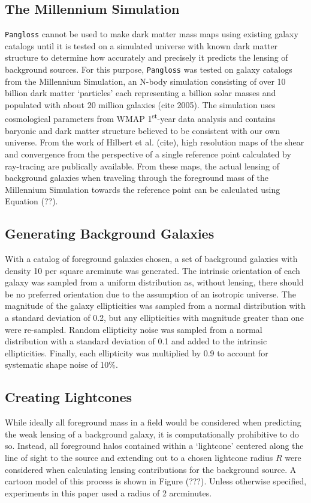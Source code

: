 \documentclass[%
 reprint,
 amsmath,amssymb,
 aps,
]{revtex4-1}
\begin{document}
\subsection*{The Millennium Simulation}
\texttt{Pangloss} cannot be used to make dark matter mass maps using existing galaxy catalogs until it is tested on a simulated universe with known dark matter structure to determine how accurately and precisely it predicts the lensing of background sources. For this purpose, \texttt{Pangloss} was tested on galaxy catalogs from the Millennium Simulation, an N-body simulation consisting of over 10 billion dark matter `particles' each representing a billion solar masses and populated with about 20 million galaxies (cite 2005). The simulation uses cosmological parameters from WMAP 1\textsuperscript{st}-year data analysis and contains baryonic and dark matter structure believed to be consistent with our own universe. From the work of Hilbert et al. (cite), high resolution maps of the shear and convergence from the perspective of a single reference point calculated by ray-tracing are publically available. From these maps, the actual lensing of background galaxies when traveling through the foreground mass of the Millennium Simulation towards the reference point can be calculated using Equation (??).

\subsection*{Generating Background Galaxies}
With a catalog of foreground galaxies chosen, a set of background galaxies with density 10 per square arcminute was generated. The intrinsic orientation of each galaxy was sampled from a uniform distribution as, without lensing, there should be no preferred orientation due to the assumption of an isotropic universe. The magnitude of the galaxy ellipticities was sampled from a normal distribution with a standard deviation of 0.2, but any ellipticities with magnitude greater than one were re-sampled. Random ellipticity noise was sampled from a normal distribution with a standard deviation of 0.1 and added to the intrinsic ellipticities. Finally, each ellipticity was multiplied by 0.9 to account for systematic shape noise of 10\%.

\subsection*{Creating Lightcones}
While ideally all foreground mass in a field would be considered when predicting the weak lensing of a background galaxy, it is computationally prohibitive to do so. Instead, all foreground halos contained within a `lightcone' centered along the line of sight to the source and extending out to a chosen lightcone radius $R$ were considered when calculating lensing contributions for the background source. A cartoon model of this process is shown in Figure (???). Unless otherwise specified, experiments in this paper used a radius of 2 arcminutes.
\end{document}
